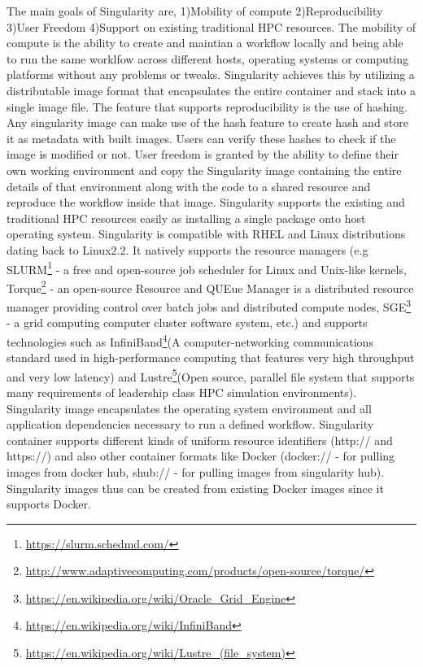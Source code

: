The main goals of Singularity are, 1)Mobility of compute 2)Reproducibility 3)User Freedom 4)Support on existing traditional HPC resources. The mobility of compute is the ability to create and maintian a workflow locally and being able to run the same worklfow across different hosts, operating systems or computing platforms without any problems or tweaks. Singularity achieves this by utilizing a distributable image format that encapsulates the entire container and stack into a single image file. The feature that supports reproducibility is the use of hashing. Any singularity image can make use of the hash feature to create hash and store it as metadata with built images. Users can verify these hashes to check if the image is modified or not. User freedom is granted by the ability to define their own working environment and copy the Singularity image containing the entire details of that environment along with the code to a shared resource and reproduce the workflow inside that image. Singularity supports the existing and traditional HPC resources easily as installing a single package onto host operating system. Singularity is compatible with RHEL and Linux distributions dating back to Linux2.2. It natively supports the resource managers (e.g SLURM\footnote{\url{https://slurm.schedmd.com/}} - a free and open-source job scheduler for Linux and Unix-like kernels, Torque\footnote{\url{http://www.adaptivecomputing.com/products/open-source/torque/}} - an open-source Resource and QUEue Manager is a distributed resource manager providing control over batch jobs and distributed compute nodes, SGE\footnote{\url{https://en.wikipedia.org/wiki/Oracle_Grid_Engine}} - a grid computing computer cluster software system, etc.) and supports technologies such as InfiniBand\footnote{\url{https://en.wikipedia.org/wiki/InfiniBand}}(A computer-networking communications standard used in high-performance computing that features very high throughput and very low latency) and Lustre\footnote{\url{https://en.wikipedia.org/wiki/Lustre_(file_system)}}(Open source, parallel file system that supports many requirements of leadership class HPC simulation environments).\\

Singularity image encapsulates the operating system environment and all application dependencies necessary to run a defined workflow. Singularity container supports different kinds of uniform resource identifiers (http:// and https://) and also other container formats like Docker (docker:// - for pulling images from docker hub, shub:// - for pulling images from singularity hub). Singularity images thus can be created from existing Docker images since it supports Docker.
 
